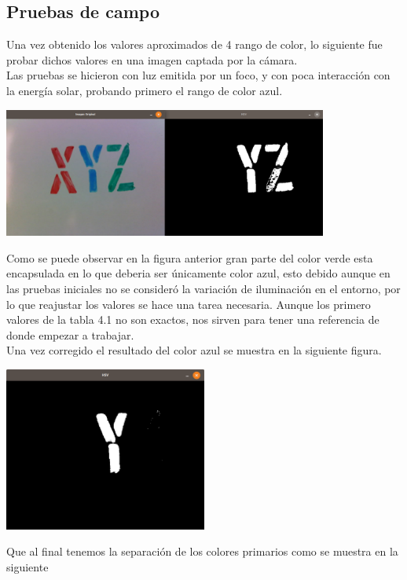 \subsection{Pruebas de campo}
Una vez obtenido los valores aproximados de 4 rango de color, lo siguiente fue probar
dichos valores en una imagen captada por la cámara.\\
Las pruebas se hicieron con luz emitida por un foco, y con poca interacción con la
energía solar, probando primero el rango de color azul.
\begin{center}
	\includegraphics[width=0.8\textwidth]{Contenido/Cuerpo/Capitulo4/Fig7.eps}
	\label{Fig7}
\end{center}
Como se puede observar en la figura anterior gran parte del color verde esta encapsulada
en lo que deberia ser únicamente color azul, esto debido aunque en las pruebas iniciales
no se consideró la variación de iluminación en el entorno, por lo que reajustar los
valores se hace una tarea necesaria. Aunque los primero valores de la tabla 4.1
no son exactos, nos sirven para tener una referencia de donde empezar a trabajar.\\
Una vez corregido el resultado del color azul se muestra en la siguiente figura.
\begin{center}
	\includegraphics[width=0.5\textwidth]{Contenido/Cuerpo/Capitulo4/Fig9.eps}
	\label{Fig8}
\end{center}
Que al final tenemos la separación de los colores primarios como se muestra en la siguiente

